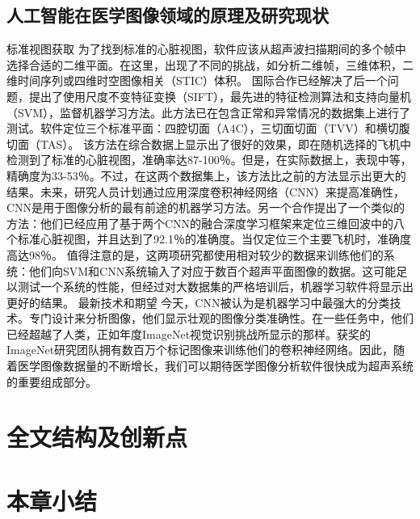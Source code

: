 \subsection{人工智能在医学图像领域的原理及研究现状}
标准视图获取
为了找到标准的心脏视图，软件应该从超声波扫描期间的多个帧中选择合适的二维平面。在这里，出现了不同的挑战，如分析二维帧，三维体积，二维时间序列或四维时空图像相关（STIC）体积。
国际合作已经解决了后一个问题，提出了使用尺度不变特征变换（SIFT），最先进的特征检测算法和支持向量机（SVM），监督机器学习方法。此方法已在包含正常和异常情况的数据集上进行了测试。软件定位三个标准平面：四腔切面（A4C），三切面切面（TVV）和横切腹切面（TAS）。
该方法在综合数据上显示出了很好的效果，即在随机选择的飞机中检测到了标准的心脏视图，准确率达87-100％。但是，在实际数据上，表现中等，精确度为33-53％。不过，在这两个数据集上，该方法比之前的方法显示出更大的结果。未来，研究人员计划通过应用深度卷积神经网络（CNN）来提高准确性，CNN是用于图像分析的最有前途的机器学习方法。另一个合作提出了一个类似的方法：他们已经应用了基于两个CNN的融合深度学习框架来定位三维回波中的八个标准心脏视图，并且达到了92.1％的准确度。当仅定位三个主要飞机时，准确度高达98％。
值得注意的是，这两项研究都使用相对较少的数据来训练他们的系统：他们向SVM和CNN系统输入了对应于数百个超声平面图像的数据。这可能足以测试一个系统的性能，但经过对大数据集的严格培训后，机器学习软件将显示出更好的结果。
最新技术和期望
今天，CNN被认为是机器学习中最强大的分类技术。专门设计来分析图像，他们显示壮观的图像分类准确性。在一些任务中，他们已经超越了人类，正如年度ImageNet视觉识别挑战所显示的那样。获奖的ImageNet研究团队拥有数百万个标记图像来训练他们的卷积神经网络。因此，随着医学图像数据量的不断增长，我们可以期待医学图像分析软件很快成为超声系统的重要组成部分。
\section{全文结构及创新点}

\section{本章小结}